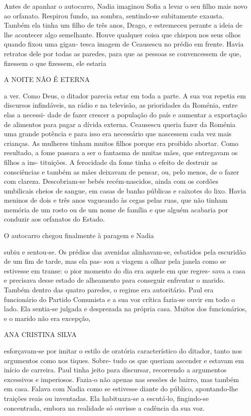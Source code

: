 Antes de apanhar o autocarro, Nadia imaginou Sofia a levar o seu filho
mais novo ao orfanato. Respirou fundo, na sombra, sentindo‑se
subitamente exausta. Também ela tinha um filho de três anos, Drago, e
estremeceu perante a ideia de lhe acontecer algo semelhante. Houve
qualquer coisa que chispou nos seus olhos quando fixou uma gigan‑ tesca
imagem de Ceausescu no prédio em frente. Havia retratos dele por todas
as paredes, para que as pessoas se convencessem de que, fizessem o que
fizessem, ele estaria

A NOITE NÃO É ETERNA

a ver. Como Deus, o ditador parecia estar em toda a parte. A sua voz
repetia em discursos infindáveis, na rádio e na televisão, as
prioridades da Roménia, entre elas a necessi‑ dade de fazer crescer a
população do país e aumentar a exportação de alimentos para pagar a
dívida externa. Ceausescu queria fazer da Roménia uma grande potência e
para isso era necessário que nascessem cada vez mais crianças. As
mulheres tinham muitos filhos porque era proibido abortar. Como
resultado, a fome passara a ser o fantasma de muitas mães, que
entregavam os filhos a ins‑ tituições. A ferocidade da fome tinha o
efeito de destruir as consciências e também as mães deixavam de pensar,
ou, pelo menos, de o fazer com clareza. Descobriam‑se bebés
recém‑nascidos, ainda com os cordões umbilicais cheios de sangue, em
casas de banho públicas e caixotes do lixo. Havia meninos de dois e três
anos vagueando às cegas pelas ruas, que não tinham memória de um rosto
ou de um nome de família e que alguém acabaria por conduzir aos
orfanatos do Estado.

O autocarro chegou finalmente à paragem e Nadia

subiu e sentou‑se. Os prédios das avenidas alinhavam‑se, esbatidos pela
escuridão de um fim de tarde, mas ela pas‑ sou a viagem a olhar pela
janela como se estivesse em transe: o pior momento do dia era aquele em
que regres‑ sava a casa e precisava desse estado de alheamento para
conseguir enfrentar o marido. Também dentro das quatro paredes, o regime
era autoritário. Paul era funcionário do Partido Comunista e a sua voz
crítica fazia‑se ouvir em todo o lado. Ela sentia‑se julgada e
desprezada na própria casa. Muitos dos funcionários, e o marido não era
excepção,

ANA CRISTINA SILVA

esforçavam‑se por imitar o estilo de oratória característico do ditador,
tanto nos argumentos como nos tiques. Sobre‑ tudo os que queriam
ascender e estavam em início de carreira. Paul tinha jeito para
discursar, recorrendo a argumentos excessivos e imperiosos. Fazia‑o não
apenas nas sessões de bairro, mas também em casa. Falava com Nadia como
se estivesse diante do público, apontando‑lhe traições reais ou
inventadas. Ela habituara‑se a escutá‑lo, fingindo‑se concentrada,
embora na realidade só ouvisse a cadência da sua voz.

